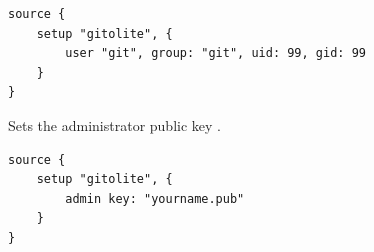 \begin{lstlisting}[style=Java]
source {
    setup "gitolite", {
        user "git", group: "git", uid: 99, gid: 99
    }
}
\end{lstlisting}


Sets the administrator public key .

\begin{lstlisting}[style=Java]
source {
    setup "gitolite", {
        admin key: "yourname.pub"
    }
}
\end{lstlisting}
